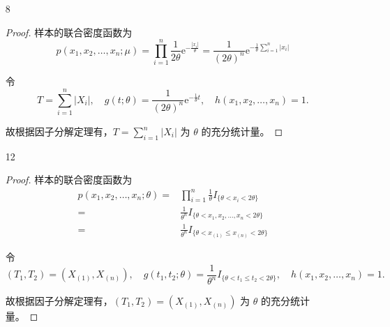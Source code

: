 \documentclass[normal,cn]{elegantnote}
\begin{document}
\begin{enumerate}
\begin{proof}
            令
            \begin{equation*}
                T=\sum_{i=1}^{n}X_{i}^{m},\quad g\left(t;\theta\right)=\theta^{-mn}\mathrm{e}^{-\frac{t}{\theta^{m}}},\quad h\left(x_{1},x_{2},\ldots,x_{n}\right)=m^{n}\left(\prod_{i=1}^{n}x_{i}\right)^{m-1}.
            \end{equation*}

            故根据因子分解定理有，$T=\sum_{i=1}^{n}X_{i}^{m}$ 为 $\theta$ 的充分统计量。
        \end{proof}
    \item[8]
        \begin{proof}
            样本的联合密度函数为
            \begin{equation*}
                p\left(x_{1},x_{2},\ldots,x_{n};\mu\right)=\prod_{i=1}^{n}\frac{1}{2\theta}\mathrm{e}^{-\frac{\left|x_{i}\right|}{\theta}}=\frac{1}{(2\theta)^{n}}\mathrm{e}^{-\frac{1}{\theta}\sum_{i=1}^{n}\left|x_{i}\right|}
            \end{equation*}

            令
            \begin{equation*}
                T=\sum_{i=1}^{n}\left|X_{i}\right|,\quad g\left(t;\theta\right)=\frac{1}{(2\theta)^{n}}\mathrm{e}^{-\frac{1}{\theta}t},\quad h\left(x_{1},x_{2},\ldots,x_{n}\right)=1.
            \end{equation*}

            故根据因子分解定理有，$T=\sum_{i=1}^{n}\left|X_{i}\right|$ 为 $\theta$ 的充分统计量。
        \end{proof}
    \item[12]
        \begin{proof}
            样本的联合密度函数为
            \begin{equation*}
                \begin{aligned}
                    p\left(x_{1},x_{2},\ldots,x_{n};\theta\right)= & \prod_{i=1}^{n}\frac{1}{\theta}I_{\{\theta<x_{i}<2\theta\}}         \\
                    =                                              & \frac{1}{\theta^{n}}I_{\{\theta<x_{1},x_{2},\ldots,x_{n}<2\theta\}} \\
                    =                                              & \frac{1}{\theta^{n}}I_{\{\theta<x_{(1)}\leq x_{(n)}<2\theta\}}
                \end{aligned}
            \end{equation*}

            令
            \begin{equation*}
                \left(T_{1},T_{2}\right)=\left(X_{(1)},X_{(n)}\right),\quad g\left(t_{1},t_{2};\theta\right)=\frac{1}{\theta^{n}}I_{\{\theta<t_{1}\leq t_{2}<2\theta\}},\quad h\left(x_{1},x_{2},\ldots, x_{n}\right)=1.
            \end{equation*}

            故根据因子分解定理有，$\left(T_{1},T_{2}\right)=\left(X_{(1)},X_{(n)}\right)$ 为 $\theta$ 的充分统计量。
        \end{proof}
\end{enumerate}
\end{document}
